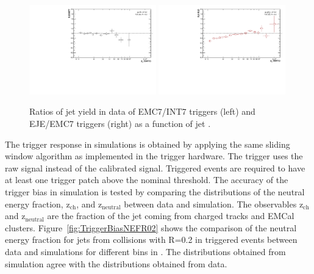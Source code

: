 \begin{figure}[hbt!]
    \centering
    \begin{multicols}{2}
            \includegraphics[width=0.49\textwidth]{figures/TriggerSwap/ratio_EMCINT_data_R02.pdf}
        \vfill\null 
        \columnbreak
            \includegraphics[width=0.49\textwidth]{figures/TriggerSwap/ratio_EJEEMC_data_R02.pdf}
        \vfill\null
    \end{multicols}
    \caption{Ratios of jet yield in \pp data of EMC7/INT7 triggers (left) and EJE/EMC7 triggers (right) as a function of jet \pT.}
    \label{fig:trigger_ratios}
\end{figure}

The trigger response in simulations is obtained by applying the same sliding window algorithm as implemented in the trigger hardware. The trigger uses the raw signal instead of the calibrated signal. Triggered events are required to have at least one trigger patch above the nominal threshold. The accuracy of the trigger bias in simulation is tested by comparing the distributions of the neutral energy fraction, z$_\mathrm{ch}$, and z$_\mathrm{neutral}$ between data and simulation. The observables z$_\mathrm{ch}$ and z$_\mathrm{neutral}$ are the fraction of the jet \pT coming from charged tracks and EMCal clusters. Figure~\ref{fig:TriggerBiasNEFR02} shows the comparison of the neutral energy fraction for jets from \pp collisions with R=0.2 in triggered events between data and simulations for different bins in \pT. The distributions obtained from simulation agree with the distributions obtained from data. 

